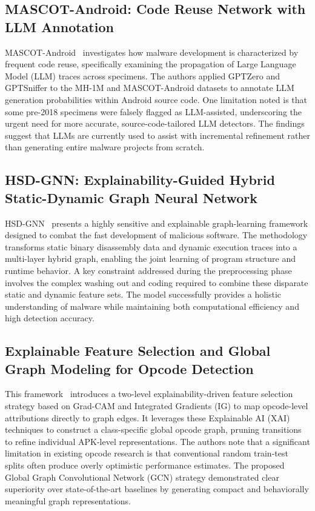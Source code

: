 \documentclass[12pt,a4paper,oneside]{report}
\begin{document}
\subsection{MASCOT-Android: Code Reuse Network with LLM Annotation}
MASCOT-Android~\cite{ref19} investigates how malware development is characterized by frequent code reuse, specifically examining the propagation of Large Language Model (LLM) traces across specimens. The authors applied GPTZero and GPTSniffer to the MH-1M and MASCOT-Android datasets to annotate LLM generation probabilities within Android source code. One limitation noted is that some pre-2018 specimens were falsely flagged as LLM-assisted, underscoring the urgent need for more accurate, source-code-tailored LLM detectors. The findings suggest that LLMs are currently used to assist with incremental refinement rather than generating entire malware projects from scratch.

\subsection{HSD-GNN: Explainability-Guided Hybrid Static-Dynamic Graph Neural Network}
HSD-GNN~\cite{ref20} presents a highly sensitive and explainable graph-learning framework designed to combat the fast development of malicious software. The methodology transforms static binary disassembly data and dynamic execution traces into a multi-layer hybrid graph, enabling the joint learning of program structure and runtime behavior. A key constraint addressed during the preprocessing phase involves the complex washing out and coding required to combine these disparate static and dynamic feature sets. The model successfully provides a holistic understanding of malware while maintaining both computational efficiency and high detection accuracy.

\subsection{Explainable Feature Selection and Global Graph Modeling for Opcode Detection}
This framework~\cite{ref21} introduces a two-level explainability-driven feature selection strategy based on Grad-CAM and Integrated Gradients (IG) to map opcode-level attributions directly to graph edges. It leverages these Explainable AI (XAI) techniques to construct a class-specific global opcode graph, pruning transitions to refine individual APK-level representations. The authors note that a significant limitation in existing opcode research is that conventional random train-test splits often produce overly optimistic performance estimates. The proposed Global Graph Convolutional Network (GCN) strategy demonstrated clear superiority over state-of-the-art baselines by generating compact and behaviorally meaningful graph representations.
\end{document}
